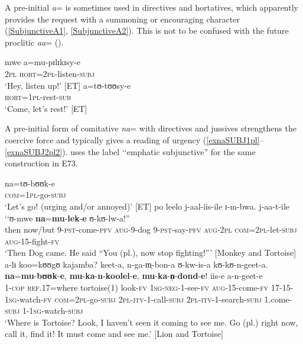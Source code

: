 A pre-initial \textit{a}= is sometimes used in directives and hortatives, which apparently provides the request with a summoning or encouraging character (\ref{SubjunctiveA1}, \ref{SubjunctiveA2}). This is not to be confused with the future proclitic \textit{aa}= ().

\begin{exe}
\ex \label{SubjunctiveA1}\gll mwe a=mu-pɪlɪkɪsy-e\\
\textsc{2pl} \textsc{hort}=\textsc{2pl}-listen-\textsc{subj}\\
\glt \lq Hey, listen up!' [ET]
\ex \label{SubjunctiveA2}\gll a=tʊ-tʊʊsy-e\\
\textsc{hort}=\textsc{1pl}-rest-\textsc{sub}\\
\glt \lq Come, let's rest!' [ET]
\end{exe}

\largerpage
\label{SubjunctiveNa} A pre-initial form of comitative \textit{na}= with directives and jussives strengthens the coercive force and typically gives a reading of urgency (\ref{exnaSUBJ1pl}--\ref{exnaSUBJ2pl2}). \citet[89]{NicolleS2013b} uses the label \lq\lq emphatic subjunctive'' for the same construction in  E73.
\begin{exe}
\ex \label{exnaSUBJ1pl}
\gll na=tʊ-bʊʊk-e\\
\textsc{com}=\textsc{1pl}-go-\textsc{subj}\\
\glt \lq Let's go! (urging and/or annoyed)' [ET]
\ex \label{exnaSUBJ2pl1} \gll po leelo j-aal-iis-ile ɪ-m-bwa. j-aa-t-ile \textup{\lq\lq}ʊ-mwe \textbf{na}=\textbf{mu}-\textbf{lek}-\textbf{e} ʊ-kʊ-lw-a!\textup{''}\\
then now/but 9-\textsc{pst}-come-\textsc{pfv} \textsc{aug}-9-dog 9-\textsc{pst}-say-\textsc{pfv} \phantom{\lq\lq}\textsc{aug}-\textsc{2pl} \textsc{com}=\textsc{2pl}-let-\textsc{subj} \textsc{aug}-15-fight-\textsc{fv}\\\glt `Then Dog came. He said ``You (pl.), now stop fighting!''{}' [Monkey and Tortoise]
\ex \label{exnaSUBJ2pl2}\gll a-lɪ koo=kʊʊgʊ kajamba? keet-a, n-ga-m̩-bon-a ʊ-kw-is-a kʊ-kʊ-n-geet-a. \textbf{na}=\textbf{mu}-\textbf{bʊʊk}-\textbf{e}, \textbf{mu}-\textbf{ka}-\textbf{n}-\textbf{koolel}-\textbf{e}, \textbf{mu}-\textbf{ka}-\textbf{n̩}-\textbf{dond}-\textbf{e}! iis-e a-n-geet-e\\
1-\textsc{cop} \textsc{ref.17}=where tortoise(1) look-\textsc{fv} \textsc{1sg}-\textsc{neg}-1-see-\textsc{fv} \textsc{aug}-15-come-\textsc{fv} 17-15-\textsc{1sg}-watch-\textsc{fv} \textsc{com}=\textsc{2pl}-go-\textsc{subj} \textsc{2pl}-\textsc{itv}-1-call-\textsc{subj} \textsc{2pl}-\textsc{itv}-1-search-\textsc{subj} 1.come-\textsc{subj} 1-\textsc{1sg}-watch-\textsc{subj}\\
\glt `Where is Tortoise?  ‎‎Look, I haven't seen it coming to see me.  ‎‎Go (pl.) right now, call it, find it! It must come and see me.' [Lion and Tortoise]
\end{exe}

